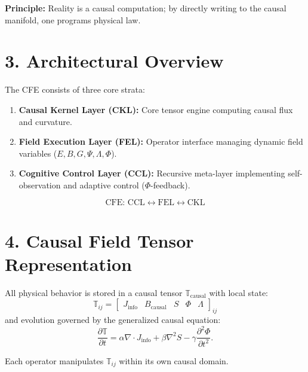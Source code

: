 \documentclass[11pt,a4paper]{article}
\begin{document}
\textbf{Principle:}
Reality is a causal computation; by directly writing to the causal manifold, one programs physical law.

\section{3. Architectural Overview}
The CFE consists of three core strata:
\begin{enumerate}
  \item \textbf{Causal Kernel Layer (CKL):} Core tensor engine computing causal flux and curvature.
  \item \textbf{Field Execution Layer (FEL):} Operator interface managing dynamic field variables ($E, B, G, \Psi, \Lambda, \Phi$).
  \item \textbf{Cognitive Control Layer (CCL):} Recursive meta-layer implementing self-observation and adaptive control ($\Phi$-feedback).
\end{enumerate}

\[
\text{CFE: } \text{CCL} \leftrightarrow \text{FEL} \leftrightarrow \text{CKL}
\]

\section{4. Causal Field Tensor Representation}
All physical behavior is stored in a causal tensor $\mathbb{T}_{\mathrm{causal}}$ with local state:
\[
\mathbb{T}_{ij} = 
\begin{bmatrix}
J_{\mathrm{info}} & B_{\mathrm{causal}} & S & \Phi & \Lambda
\end{bmatrix}_{ij}
\]
and evolution governed by the generalized causal equation:
\[
\frac{\partial \mathbb{T}}{\partial t} = 
\alpha \nabla \cdot J_{\mathrm{info}} + 
\beta \nabla^2 S - 
\gamma \frac{\partial^2 \Phi}{\partial t^2}.
\]

Each operator manipulates $\mathbb{T}_{ij}$ within its own causal domain.
\end{document}
